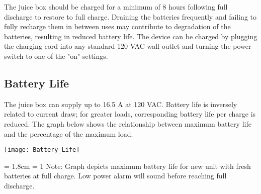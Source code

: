 \documentclass[../jb_user_manual.tex]{subfiles}
\begin{document}
The juice box should be charged for a minimum of 8 hours following full discharge to restore to full charge.  Draining the batteries frequently and failing to fully recharge them in between uses may contribute to degradation of the batteries, resulting in reduced battery life.  The device can be charged by plugging the charging cord into any standard 120 VAC wall outlet and turning the power switch to one of the "on" settings.

\subsection{\Large{Battery Life}}

The juice box can supply up to 16.5 A at 120 VAC.  Battery life is inversely related to current draw; for greater loads, corresponding battery life per charge is reduced.  The graph below shows the relationship between maximum battery life and the percentage of the maximum load.

\vspace{3mm}
\texttt{[image: Battery\_Life]}
\vspace{3mm}

\hangindent = 1.8cm
\hangafter = 1
Note: Graph depicts maximum battery life for new unit with fresh batteries at full charge.  Low power alarm will sound before reaching full discharge.
\end{document}
